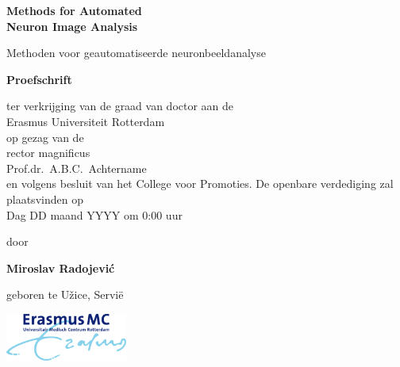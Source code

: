 %
%

\setlength{\parindent}{0pt}
\thispagestyle{empty}

\begin{center}
  
  \vspace*{5mm}
  {\huge\bf Methods for Automated\\[0.3ex] Neuron Image Analysis\\}

  \vfill
  \vfill
  \vfill

  {\large Methoden voor geautomatiseerde neuronbeeldanalyse\\[1ex]}


  \vfill
  \vfill
  \vfill
  \vfill

  {\large\bf Proefschrift}
  {\large 
  \vfill
  \vfill
  
  \normalsize
  
  ter verkrijging van de graad van doctor aan de \\Erasmus Universiteit Rotterdam\\
op gezag van de \\rector magnificus\\
  \vfill
Prof.dr.~A.B.C.~Achtername\\
  \vfill
en volgens besluit van het College voor Promoties. 
  \vfill
De openbare verdediging zal plaatsvinden op \\Dag DD maand YYYY om 0:00 uur
  
  
  \vfill
  \vfill
  
  \large
  door}

  \vfill
  \vfill
  \vfill

  {\large\bf Miroslav Radojevi\'{c}}

  \vfill

  {\large geboren te U\v{z}ice, Servi{\"e}}

  \vfill
  \vfill
\includegraphics[width=0.3\textwidth]{./logos/emc}
\end{center}



